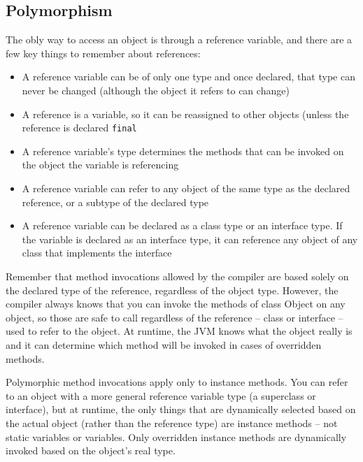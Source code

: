 \subsection{Polymorphism}
The obly way to access an object is through a reference variable, and there are 
a few key things to remember about references:
\begin{itemize}
    \item A reference variable can be of only one type and once declared, that 
    type can never be changed (although the object it refers to can change)
    \item A reference is a variable, so it can be reassigned to other objects 
    (unless the reference is declared \verb#final#
    \item A reference variable's type determines the methods that can be 
    invoked on the object the variable is referencing
    \item A reference variable can refer to any object of the same type as the 
    declared reference, or a subtype of the declared type
    \item A reference variable can be declared as a class type or an interface 
    type. If the variable is declared as an interface type, it can reference 
    any object of any class that implements the interface
\end{itemize}
Remember that method invocations allowed by the compiler are based solely on 
the declared type of the reference, regardless of the object type. However, the 
compiler always knows that you can invoke the methods of class Object on any 
object, so those are safe to call regardless of the reference -- class or 
interface -- used to refer to the object. At runtime, the JVM knows what the 
object really is and it can determine which method will be invoked in cases of 
overridden methods.

Polymorphic method invocations apply only to instance methods. You can refer to 
an object with a more general reference variable type (a superclass or 
interface), but at runtime, the only things that are dynamically selected based 
on the actual object (rather than the reference type) are instance methods -- 
not static variables or variables. Only overridden instance methods are 
dynamically invoked based on the object's real type.

